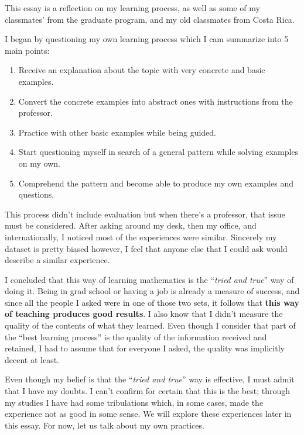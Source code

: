 \documentclass[a4paper,12pt,final]{book}
\begin{document}
 
This essay is a reflection on my learning process, as well as some of my classmates' from the graduate program, and my old classmates from Costa Rica.\par 
I began by questioning my own learning process which I cam summarize into 5 main points:
\begin{enumerate}
    \item Receive an explanation about the topic with very concrete and basic examples. 
    \item Convert the concrete examples into abstract ones with instructions from the professor. 
    \item Practice with other basic examples while being guided.
    \item Start questioning myself in search of a general pattern while solving examples on my own.
    \item Comprehend the pattern and become able to produce my own examples and questions.
\end{enumerate}
This process didn't include evaluation but when there's a professor, that issue must be considered. After asking around my desk, then my office, and internationally, I noticed most of the experiences were similar. Sincerely my dataset is pretty biased however, I feel that anyone else that I could ask would describe a similar experience.\par 
I concluded that this way of learning mathematics is the ``\emph{tried and true}'' way of doing it. Being in grad school or having a job is already a measure of success, and since all the people I asked were in one of those two sets, it follows that \textbf{this way of teaching produces good results}. I also know that I didn't measure the quality of the contents of what they learned. Even though I consider that part of the ``best learning process'' is the quality of the information received and retained, I had to assume that for everyone I asked, the quality was implicitly decent at least.\par 
Even though my belief is that the ``\emph{tried and true}'' way is effective, I must admit that I have my doubts. I can't confirm for certain that this is the best; through my studies I have had some tribulations which, in some cases, made the experience not as good in some sense. We will explore these experiences later in this essay. For now, let us talk about my own practices.\par 
\end{document}
